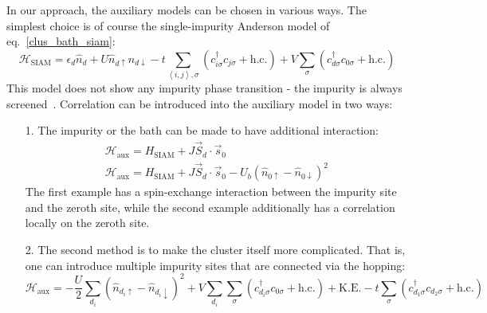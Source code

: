 \documentclass{report}
\numberwithin{equation}{section}
\begin{document}
In our approach, the auxiliary models can be chosen in various ways. The simplest choice is of course the single-impurity Anderson model of eq.~\ref{clus_bath_siam}:
\begin{equation}
\mathcal{H}_\text{SIAM} = \epsilon_d \hat n_d + U \hat n_{d \uparrow} \hat n_{d \downarrow} - t\sum_{\left<i,j \right>, \sigma}\left(c^\dagger_{i\sigma}c_{j\sigma} + \text{h.c.}\right) + V\sum_\sigma \left( c^\dagger_{d\sigma}c_{0\sigma} + \text{h.c.}\right) 
\end{equation}
This model does not show any impurity phase transition - the impurity is always screened~\cite{hrk_wilson_1980,wilson1975,bullaNRGreview}. Correlation can be introduced into the auxiliary model in two ways:
\begin{itemize}
	\item[1.] The impurity or the bath can be made to have additional interaction: 
\begin{gather}
\mathcal{H}_\text{aux} = H_\text{SIAM} + J \vec{S}_d\cdot\vec{s}_0\\
\mathcal{H}_\text{aux} = H_\text{SIAM} + J \vec{S}_d\cdot\vec{s}_0 - U_b \left(\hat n_{0 \uparrow} - \hat n_{0 \downarrow}\right)^2
\end{gather}
The first example has a spin-exchange interaction between the impurity site and the zeroth site, while the second example additionally has a correlation locally on the zeroth site.
\item[2.] The second method is to make the cluster itself more complicated. That is, one can introduce multiple impurity sites that are connected via the hopping:
\begin{equation}
\mathcal{H}_\text{aux} = -\frac{U}{2}\sum_{d_i}\left(\hat n_{d_i \uparrow} - \hat n_{d_i \downarrow}\right) ^2 + V\sum_{d_i}\sum_\sigma\left( c^\dagger_{d_i\sigma}c_{0\sigma} + \text{h.c.} \right) + \text{K.E.} - t\sum_{\sigma}\left(c^\dagger_{d_1\sigma}c_{d_2\sigma} + \text{h.c.}\right)
\end{equation}
	
\end{itemize}
\end{document}
